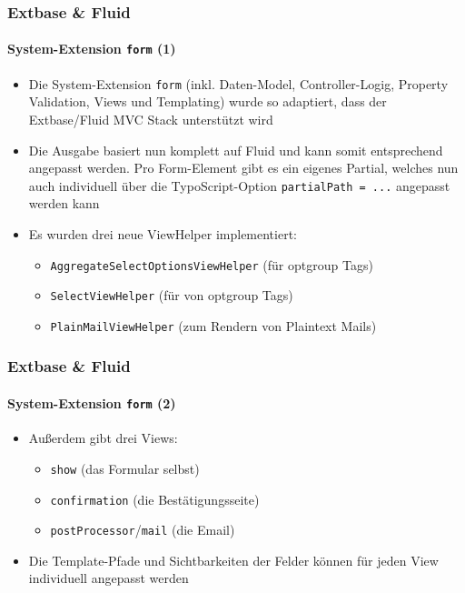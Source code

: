 \begin{frame}[fragile]
	\frametitle{Extbase \& Fluid}
	\framesubtitle{System-Extension \texttt{form} (1)}

	\begin{itemize}

		\item Die System-Extension \texttt{form} (inkl. Daten-Model, Controller-Logig,
			Property Validation, Views und Templating) wurde so adaptiert, dass der
			Extbase/Fluid MVC Stack unterstützt wird

		\item Die Ausgabe basiert nun komplett auf Fluid und kann somit entsprechend
			angepasst werden. Pro Form-Element gibt es ein eigenes Partial, welches
			nun auch individuell über die TypoScript-Option \texttt{partialPath = ...}
			angepasst werden kann

		\item Es wurden drei neue ViewHelper implementiert:

			\begin{itemize}
				\item \texttt{AggregateSelectOptionsViewHelper} (für optgroup Tags)
				\item \texttt{SelectViewHelper} (für von optgroup Tags)
				\item \texttt{PlainMailViewHelper} (zum Rendern von Plaintext Mails)
			\end{itemize}

	\end{itemize}

\end{frame}


\begin{frame}[fragile]
	\frametitle{Extbase \& Fluid}
	\framesubtitle{System-Extension \texttt{form} (2)}

	\begin{itemize}

		\item Außerdem gibt drei Views:

			\begin{itemize}
				\item \texttt{show} (das Formular selbst)
				\item \texttt{confirmation} (die Bestätigungsseite)
				\item \texttt{postProcessor}/\texttt{mail} (die Email)
			\end{itemize}

		\item Die Template-Pfade und Sichtbarkeiten der Felder können für jeden
			View individuell angepasst werden

	\end{itemize}

\end{frame}

